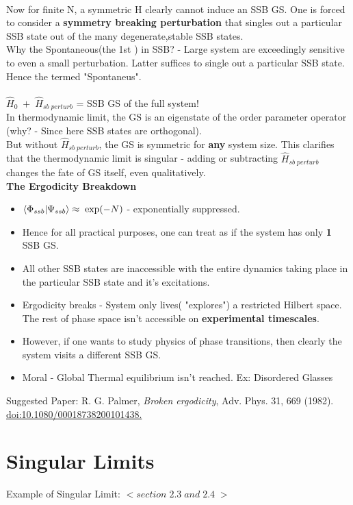 \documentclass[12pt]{article}
\begin{document}
\\
Now for finite N, a symmetric H clearly cannot induce an SSB GS. One is forced to consider a \textbf{symmetry breaking perturbation} that singles out a particular SSB state out of the many degenerate,stable SSB states.\\
Why the Spontaneous(the 1st ) in SSB? - Large system are exceedingly sensitive to even a small perturbation. Latter  suffices to single out a particular SSB state. Hence the termed "Spontaneus".\\
\\
$\hat{H}_0\;+\;\hat{H}_{sb\;perturb}$ = SSB GS of the full system!\\
In thermodynamic limit, the GS is an eigenstate of the order parameter operator (why? - Since here SSB states are orthogonal).\\
But without $\hat{H}_{sb\;perturb}$, the GS is symmetric for \textbf{any} system size. This clarifies that the thermodynamic limit is singular - adding or subtracting $\hat{H}_{sb\;perturb}$ changes the fate of GS itself, even qualitatively.\\
\newline
\textbf{The Ergodicity Breakdown}
\begin{itemize}
    \item $\braket{\Phi_{ssb}}{\Psi_{ssb}}\approx\;\exp(-N)$ - exponentially suppressed.
    \item Hence for all practical purposes, one can treat as if the system has only \textbf{1} SSB GS.
    \item All other SSB states are inaccessible with the entire dynamics taking place in the particular SSB state and it's excitations.
    \item Ergodicity breaks - System only lives( "explores") a restricted Hilbert space. The rest of phase space isn't accessible on \textbf{experimental timescales}.
    \item However, if one wants to study physics of phase transitions, then clearly the system visits a different SSB GS.
    \item Moral - Global Thermal equilibrium isn't reached. Ex: Disordered Glasses
\end{itemize}
Suggested Paper: R. G. Palmer,\textit{ Broken ergodicity}, Adv. Phys. 31, 669 (1982).\\
\href{https://www.tandfonline.com/doi/abs/10.1080/00018738200101438}{doi:10.1080/00018738200101438.}

\section{Singular Limits}
Example of Singular Limit:
$<section\; 2.3 \;and\; 2.4\;>$
\end{document}
